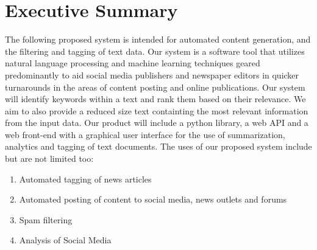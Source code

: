 \documentclass[12pt]{article}
\begin{document}
\maketitle


%
%

\section{Executive Summary}

The following proposed system is intended for automated content generation, and the filtering and tagging of text data. Our system is a software tool that utilizes natural language processing and machine learning techniques geared predominantly to aid social media publishers and newspaper editors in quicker turnarounds in the areas of content posting and online publications. Our system will identify keywords within a text and rank them based on their relevance. We aim to also provide a reduced size text containting the most relevant information from the input data. Our product will include a python library, a web API and a web front-end with a graphical user interface for the use of summarization, analytics and tagging of text documents. The uses of our proposed system include but are not limited too:
\begin{enumerate}
	\item Automated tagging of news articles
	\item Automated posting of content to social media, news outlets and forums
	\item Spam filtering
	\item Analysis of Social Media
\end{enumerate}
\end{document}
